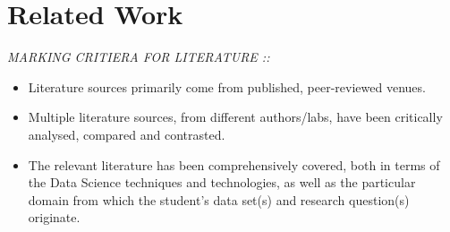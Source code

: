 \section{Related Work}
\emph{MARKING CRITIERA FOR LITERATURE :: }
\begin{itemize}
\item Literature sources primarily come from published, peer-reviewed venues.
\item Multiple literature sources, from different authors/labs, have been critically analysed, compared and contrasted.
\item The relevant literature has been comprehensively covered, both in terms of the Data Science techniques and technologies, as well as the particular domain from which the student's data set(s) and research question(s) originate.
\end{itemize}
